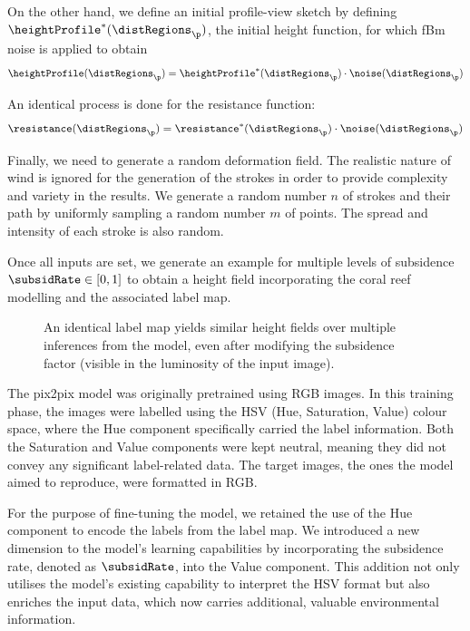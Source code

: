 On the other hand, we define an initial profile-view sketch by defining $\heightProfile^*(\distRegions_\p)$, the initial height function, for which fBm noise is applied to obtain
\begin{align}
\heightProfile(\distRegions_\p) = \heightProfile^*(\distRegions_\p) \cdot \noise(\distRegions_\p)
\end{align}

An identical process is done for the resistance function:
\begin{align}
\resistance(\distRegions_\p) = \resistance^*(\distRegions_\p) \cdot \noise(\distRegions_\p)
\end{align}

Finally, we need to generate a random deformation field. The realistic nature of wind is ignored for the generation of the strokes in order to provide complexity and variety in the results.
We generate a random number $n$ of strokes and their path by uniformly sampling a random number $m$ of points. The spread and intensity of each stroke is also random.

Once all inputs are set, we generate an example for multiple levels of subsidence $\subsidRate \in [0, 1]$ to obtain a height field incorporating the coral reef modelling and the associated label map.

\begin{figure}
\caption{An identical label map yields similar height fields over multiple inferences from the model, even after modifying the subsidence factor (visible in the luminosity of the input image).}
\label{fig:coral-island-results-subsidence}
\end{figure}

The pix2pix model was originally pretrained using RGB images. In this training phase, the images were labelled using the HSV (Hue, Saturation, Value) colour space, where the Hue component specifically carried the label information. Both the Saturation and Value components were kept neutral, meaning they did not convey any significant label-related data. The target images, the ones the model aimed to reproduce, were formatted in RGB.

For the purpose of fine-tuning the model, we retained the use of the Hue component to encode the labels from the label map. We introduced a new dimension to the model's learning capabilities by incorporating the subsidence rate, denoted as $\subsidRate$, into the Value component. This addition not only utilises the model's existing capability to interpret the HSV format but also enriches the input data, which now carries additional, valuable environmental information.

